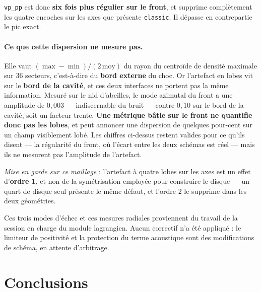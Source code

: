 \documentclass[11pt,a4paper]{article}
\begin{document}
\noindent
\texttt{vp\_pp} est donc \textbf{six fois plus régulier sur le front}, et supprime
complètement les quatre encoches sur les axes que présente \texttt{classic}. Il
dépasse en contrepartie le pic exact.

\paragraph{Ce que cette dispersion ne mesure pas.} Elle vaut
$(\max-\min)/(2\,\mathrm{moy})$ du rayon du centroïde de densité maximale sur $36$
secteurs, c'est-à-dire du \textbf{bord externe} du choc. Or l'artefact en lobes vit
sur le \textbf{bord de la cavité}, et ces deux interfaces ne portent pas la même
information. Mesuré sur le nid d'abeilles, le mode azimutal du front a une amplitude
de $0{,}003$ --- indiscernable du bruit --- contre $0{,}10$ sur le bord de la cavité,
soit un facteur trente. \textbf{Une métrique bâtie sur le front ne quantifie donc pas
les lobes}, et peut annoncer une dispersion de quelques pour-cent sur un champ
visiblement lobé. Les chiffres ci-dessus restent valides pour ce qu'ils disent --- la
régularité du front, où l'écart entre les deux schémas est réel --- mais ils ne
mesurent pas l'amplitude de l'artefact.

\emph{Mise en garde sur ce maillage} : l'artefact à quatre lobes sur les axes est un
effet d'\textbf{ordre 1}, et non de la symétrisation employée pour construire le
disque --- un quart de disque seul présente le même défaut, et l'ordre 2 le supprime
dans les deux géométries.

\medskip
\noindent
Ces trois modes d'échec et ces mesures radiales proviennent du travail de la session
en charge du module lagrangien. Aucun correctif n'a été appliqué : le limiteur de
positivité et la protection du terme acoustique sont des modifications de schéma, en
attente d'arbitrage.

\section*{Conclusions}
\end{document}
